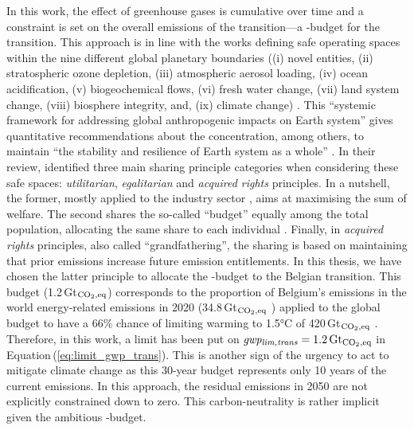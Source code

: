 In this work, the effect of greenhouse gases is cumulative over time and a constraint is set on the overall emissions of the transition---a -budget for the transition. This approach is in line with the works defining safe operating spaces within the nine different global planetary boundaries (\ie (i) novel entities, (ii) stratospheric ozone depletion, (iii) atmospheric aerosol loading, (iv) ocean acidification, (v) biogeochemical flows, (vi) fresh water change, (vii) land system change, (viii) biosphere integrity, and, (ix) climate change) \cite{richardson2023earth,steffen2015planetary,rockstrom2009safe}. This ``systemic framework for addressing global anthropogenic impacts on Earth system'' gives quantitative recommendations about the  concentration, among others, to maintain ``the stability and resilience of Earth system as a whole'' \cite{richardson2023earth}. In their review, \citet{ryberg2020downscaling} identified three main sharing principle categories when considering these safe spaces: \ie \textit{utilitarian}, \textit{egalitarian} and \textit{acquired rights} principles. In a nutshell, the former, mostly applied to the industry sector \cite{ryberg2018bring,brejnrod2017absolute}, aims at maximising the sum of welfare. The second shares the so-called ``budget'' equally among the total population, allocating the same share to each individual \cite{hoff2017bringing,o2018good}. Finally, in \textit{acquired rights} principles, also called ``grandfathering'', the sharing is based on \og maintaining that prior emissions increase future emission entitlements\fg  \cite{knight2013grandfathering}. In this thesis, we have chosen the latter principle to allocate the -budget to the Belgian transition. This budget (1.2\,Gt$_{\ce{CO2},\text{eq}}$) corresponds to the proportion of Belgium's emissions in the world energy-related emissions in 2020 (34.8\,Gt$_{\ce{CO2},\text{eq}}$ \cite{ourworldindata_CO2_world}) applied to the global budget to have a 66\% chance of limiting warming to 1.5°C of 420\,Gt$_{\ce{CO2},\text{eq}}$ \cite{IPCC_CO2_budget}. Therefore, in this work, a limit has been put on $\emph{gwp\textsubscript{lim,trans}}=1.2\,\text{Gt}_{\ce{CO2},\text{eq}}$ in Equation\,(\ref{eq:limit_gwp_trans}). This is another sign of the urgency to act to mitigate climate change as this 30-year budget represents only 10 years of the current emissions.  In this approach, the residual emissions in 2050 are not explicitly constrained down to zero. This carbon-neutrality is rather implicit given the ambitious -budget.

